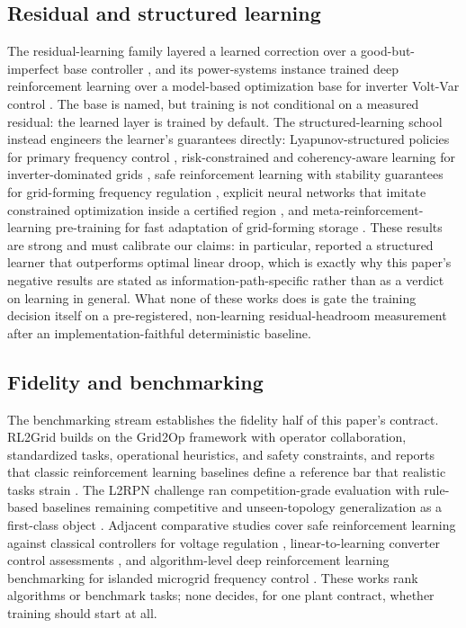 \documentclass[journal]{IEEEtran}
\begin{document}
\subsection{Residual and structured learning}
The residual-learning family layered a learned correction over a good-but-imperfect base controller \cite{johannink2019residual,silver2018residual}, and its power-systems instance trained deep reinforcement learning over a model-based optimization base for inverter Volt-Var control \cite{liu2025residual}. The base is named, but training is not conditional on a measured residual: the learned layer is trained by default. The structured-learning school instead engineers the learner's guarantees directly: Lyapunov-structured policies for primary frequency control \cite{cui2023reinforcement}, risk-constrained and coherency-aware learning for inverter-dominated grids \cite{kwon2023risk,kwon2024coherency}, safe reinforcement learning with stability guarantees for grid-forming frequency regulation \cite{shuai2024safe}, explicit neural networks that imitate constrained optimization inside a certified region \cite{ma2023safe}, and meta-reinforcement-learning pre-training for fast adaptation of grid-forming storage \cite{zhang2025pretraining}. These results are strong and must calibrate our claims: in particular, \cite{cui2023reinforcement} reported a structured learner that outperforms optimal linear droop, which is exactly why this paper's negative results are stated as information-path-specific rather than as a verdict on learning in general. What none of these works does is gate the training decision itself on a pre-registered, non-learning residual-headroom measurement after an implementation-faithful deterministic baseline.

\subsection{Fidelity and benchmarking}
The benchmarking stream establishes the fidelity half of this paper's contract. RL2Grid builds on the Grid2Op framework with operator collaboration, standardized tasks, operational heuristics, and safety constraints, and reports that classic reinforcement learning baselines define a reference bar that realistic tasks strain \cite{marchesini2025rl2grid}. The L2RPN challenge ran competition-grade evaluation with rule-based baselines remaining competitive and unseen-topology generalization as a first-class object \cite{marot2020learning,marot2022trust}. Adjacent comparative studies cover safe reinforcement learning against classical controllers for voltage regulation \cite{nguyen2026safe}, linear-to-learning converter control assessments \cite{wan2026comparative}, and algorithm-level deep reinforcement learning benchmarking for islanded microgrid frequency control \cite{salawuddeen2025benchmarking}. These works rank algorithms or benchmark tasks; none decides, for one plant contract, whether training should start at all.
\end{document}
